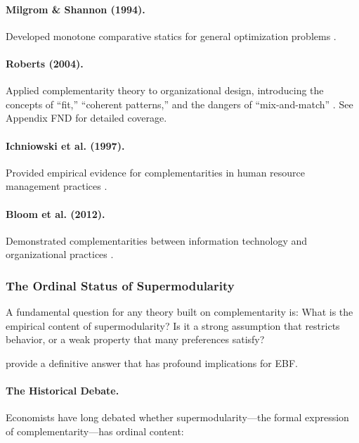 \paragraph{Milgrom \& Shannon (1994).}
Developed monotone comparative statics for general optimization problems 
\citep{milgromshannon1994}.

\paragraph{Roberts (2004).}
Applied complementarity theory to organizational design, introducing the 
concepts of ``fit,'' ``coherent patterns,'' and the dangers of ``mix-and-match'' 
\citep{roberts2004}. See Appendix FND for detailed coverage.

\paragraph{Ichniowski et al. (1997).}
Provided empirical evidence for complementarities in human resource management 
practices \citep{ichniowski1997}.

\paragraph{Bloom et al. (2012).}
Demonstrated complementarities between information technology and organizational 
practices \citep{bloom2012}.



\subsubsection{The Ordinal Status of Supermodularity}
\label{sec:ordinal-status}

A fundamental question for any theory built on complementarity is: 
What is the empirical content of supermodularity? Is it a strong assumption 
that restricts behavior, or a weak property that many preferences satisfy?

\citet{chambers2009supermodularity} provide a definitive answer that has 
profound implications for EBF.

\paragraph{The Historical Debate.}
Economists have long debated whether supermodularity---the formal expression 
of complementarity---has ordinal content:

